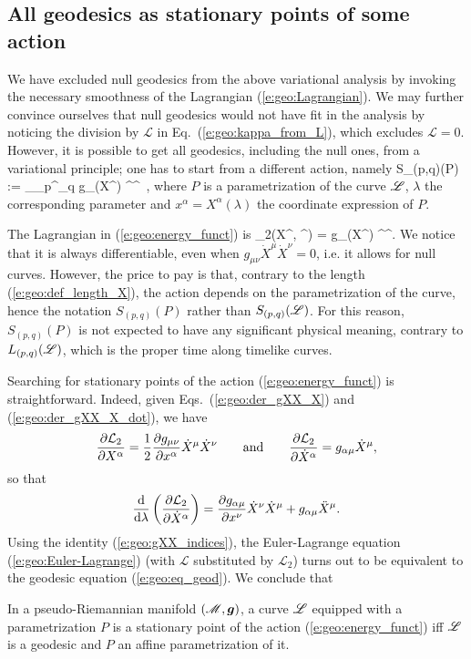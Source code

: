 \subsection{All geodesics as stationary points of some action} \label{s:geo:all_geod}

We have excluded null geodesics from the above variational analysis by
invoking the necessary smoothness of the Lagrangian (\ref{e:geo:Lagrangian}).
We may further convince ourselves that null geodesics would not have fit
in the analysis by noticing the division by $\mathcal{L}$ in Eq.~(\ref{e:geo:kappa_from_L}),
which excludes $\mathcal{L} = 0$.
However, it is possible to get all geodesics, including the null ones, from
a variational principle; one has to start from a different action, namely
\be \label{e:geo:energy_funct}
    S_{(p,q)}(P) := \int_{\lambda_p}^{\lambda_q}
        g_{\mu\nu}(X^\rho) ^\mu {}^\nu \, \D\lambda ,
\ee
where $P$ is a parametrization of the curve $\mathscr{L}$, $\lambda$
the corresponding parameter
and $x^\alpha = X^\alpha(\lambda)$ the coordinate expression of $P$.

The Lagrangian in (\ref{e:geo:energy_funct}) is
\be \label{e:geo:Lagrangian2}
   _2(X^\alpha, ^\alpha) =  
        g_{\mu\nu}(X^\rho) ^\mu {}^\nu  .
\ee
We notice that it is always differentiable, even
when $g_{\mu\nu}\dot{X}^\mu \dot{X}^\nu  = 0$, i.e. it allows for null curves.
However, the price to pay is that,
contrary to the length (\ref{e:geo:def_length_X}),
the action depends on the parametrization of the curve,
hence the notation $S_{(p,q)}(P)$ rather than $S_{(p,q)}(\mathscr{L})$.
For this reason, $S_{(p,q)}(P)$ is not expected to have any significant
physical meaning, contrary to $L_{(p,q)}(\mathscr{L})$, which is the proper
time along timelike curves.

Searching for stationary points of the action
(\ref{e:geo:energy_funct}) is straightforward. Indeed,
given Eqs.~(\ref{e:geo:der_gXX_X}) and (\ref{e:geo:der_gXX_X_dot}),
we have
\[
    \frac{\partial \mathcal{L}_2}{\partial X^\alpha} = \frac{1}{2}
        \frac{\partial g_{\mu\nu}}{\partial x^\alpha}  \dot{X}^\mu \dot{X}^\nu
    \qquad\mbox{and}\qquad
    \frac{\partial \mathcal{L}_2}{\partial \dot{X}^\alpha} = g_{\alpha\mu} \dot{X}^\mu ,
\]
so that
\[
    \frac{\mathrm{d}}{\mathrm{d}\lambda}\left( \frac{\partial \mathcal{L}_2}{\partial \dot{X}^\alpha}\right) =
      \frac{\partial g_{\alpha\mu}}{\partial x^\nu} \dot{X}^\nu \dot{X}^\mu
      + g_{\alpha\mu} \ddot{X}^\mu .
\]
Using the identity (\ref{e:geo:gXX_indices}), the Euler-Lagrange equation
(\ref{e:geo:Euler-Lagrange}) (with $\mathcal{L}$ substituted by $\mathcal{L}_2$)
turns out to be equivalent to the geodesic equation (\ref{e:geo:eq_geod}).
We conclude that
\begin{greybox}
In a pseudo-Riemannian manifold $(\mathscr{M},\bm{g})$, a
curve $\mathscr{L}$ equipped with a parametrization $P$
is a stationary point of the action (\ref{e:geo:energy_funct})
iff $\mathscr{L}$ is a geodesic and $P$ an affine parametrization of it.
\end{greybox}

